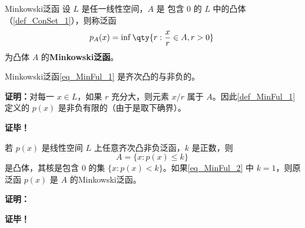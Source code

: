 

\begin{definition}{Minkowski泛函}\label{def_MinFul_1}
设 $L$ 是任一线性空间，$A$ 是 包含 0 的 $L$ 中的凸体（\autoref{def_ConSet_1}），则称泛函
\begin{equation}\label{eq_MinFul_1}
p_A(x)=\inf\qty{r:\frac{x}{r}\in A,r>0}~
\end{equation}
为凸体 $A$ 的\textbf{Minkowski泛函}。

\end{definition}


\begin{theorem}{}
Minkowski泛函\autoref{eq_MinFul_1} 是齐次凸的与非负的。
\end{theorem}

\textbf{证明：}对每一 $x\in L$，如果 $r$ 充分大，则元素 $x/r$ 属于 $A$。因此\autoref{def_MinFul_1} 定义的 $p(x)$ 是非负有限的（由于是取下确界）。




\textbf{证毕！}

\begin{theorem}{}
若 $p(x)$ 是线性空间 $L$ 上任意齐次凸非负泛函，$k$ 是正数，则
\begin{equation}\label{eq_MinFul_2}
A=\{x:p(x)\leq k\}~
\end{equation}
是凸体，其核是包含 $0$ 的集 $\{x:p(x)<k\}$。如果\autoref{eq_MinFul_2} 中 $k=1$，则原泛函 $p(x)$ 是 $A$ 的Minkowski泛函。
\end{theorem}

\textbf{证明：}




\textbf{证毕！}
